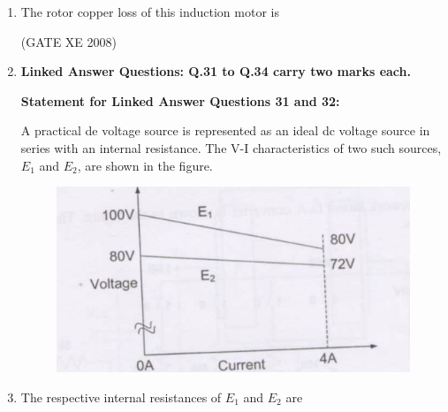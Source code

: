 \documentclass[12pt]{article}
\begin{document}
\begin{enumerate}
(GATE XE 2008)
\item  The rotor copper loss of this induction motor is

\begin{enumerate}
\end{enumerate}

(GATE XE 2008)
\item[]\textbf{\Large Linked Answer Questions: Q.31 to Q.34 carry two marks each.}

\textbf{Statement for Linked Answer Questions 31 and 32:}

A practical de voltage source is represented as an ideal dc voltage source in series with an internal
resistance. The V-I characteristics of two such sources, $E_{1}$ and $E_{2}$, are shown in the figure.

\begin{figure}[H]
  \centering
  \includegraphics[width=0.8\columnwidth]{figs/q31.png}
  \caption{}
\end{figure}

\item  The respective internal resistances of $E_{1}$ and $E_{2}$ are

\begin{enumerate}
\end{enumerate}


\end{enumerate}
\end{document}
